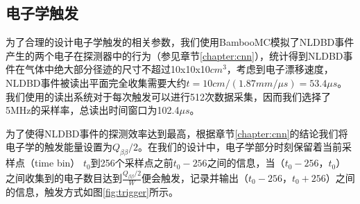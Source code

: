 \subsection{电子学触发}
为了合理的设计电子学触发的相关参数，我们使用BambooMC模拟了NLDBD事件产生的两个电子在探测器中的行为（参见章节\ref{chapter:cnn}），统计得到NLDBD事件在气体中绝大部分径迹的尺寸不超过10x10x10$cm^3$，考虑到电子漂移速度，NLDBD事件被读出平面完全收集需要大约$t=10 cm /(1.87 mm/ \mu s) = 53.4\mu s$。我们使用的读出系统对于每次触发可以进行512次数据采集，因而我们选择了5MHz的采样率，总读出时间窗口为102.4$\mu s$。

为了使得NLDBD事件的探测效率达到最高，根据章节\ref{chapter:cnn}的结论我们将电子学的触发能量设置为$Q_{\beta\beta}/2$。在我们的设计中，电子学部分时刻保留着当前采样点（time bin）
$t_0$到256个采样点之前$t_0-256$之间的信息，当（$t_0-256$，$t_0$）之间收集到的电子数目达到$\frac{Q_{\beta\beta}/2}{W}$便会触发，记录并输出（$t_0-256$，$t_0+256$）之间的信息，触发方式如图\ref{fig:trigger}所示。

